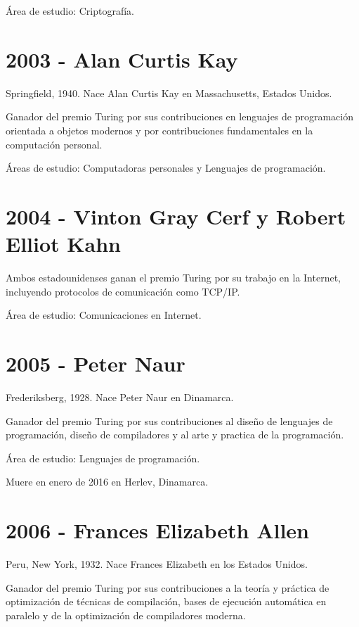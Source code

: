 \documentclass[notitlepage,letterpaper, 11pt]{article}
\begin{document}
\noindent Área de estudio: Criptografía.
\newline

\section*{2003 - Alan Curtis Kay}
\noindent Springfield, 1940. Nace Alan Curtis Kay en Massachusetts, Estados Unidos.

\noindent Ganador del premio Turing por sus contribuciones en lenguajes de programación orientada a objetos modernos y por contribuciones fundamentales en la computación personal.

\noindent Áreas de estudio: Computadoras personales y Lenguajes de programación.
\newline

\section*{2004 - Vinton Gray Cerf y Robert Elliot Kahn}
\noindent Ambos estadounidenses  ganan el premio Turing por su trabajo en la Internet, incluyendo protocolos de comunicación como TCP/IP.

\noindent Área de estudio: Comunicaciones en Internet.
\newpage

\section*{2005 - Peter Naur}
\noindent Frederiksberg, 1928. Nace Peter Naur en Dinamarca.

\noindent Ganador del premio Turing por sus contribuciones al diseño de lenguajes de programación, diseño de compiladores y al arte y practica de la programación.

\noindent Área de estudio: Lenguajes de programación.

\noindent Muere en enero de 2016 en Herlev, Dinamarca.
\newline

\section*{2006 - Frances Elizabeth Allen}
\noindent Peru, New York, 1932. Nace Frances Elizabeth en los Estados Unidos.

\noindent Ganador del premio Turing por sus contribuciones a la teoría y práctica de optimización de técnicas de compilación, bases de ejecución automática en paralelo y de la optimización de compiladores moderna.
\end{document}
